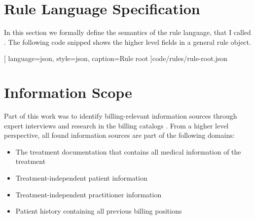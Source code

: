 \section{Rule Language Specification}\label{sec:rule-language-specification}

In this section we formally define the semantics of the rule language, that I called \RL.
The following code snipped \addref shows the higher level fields in a general rule object.

[
language=json,
style=json,
caption={Rule root}
]{code/rules/rule-root.json}

\section{Information Scope}\label{sec:information-scope}
Part of this work was
to identify billing-relevant information sources through expert interviews and research in the billing catalogs \addcite.
From a higher level perspective, all found information sources are part of the following domains:
\begin{itemize}
    \item The treatment documentation that contains all medical information of the treatment
    \item Treatment-independent patient information
    \item Treatment-independent practitioner information
    \item Patient history containing all previous billing positions
\end{itemize}







